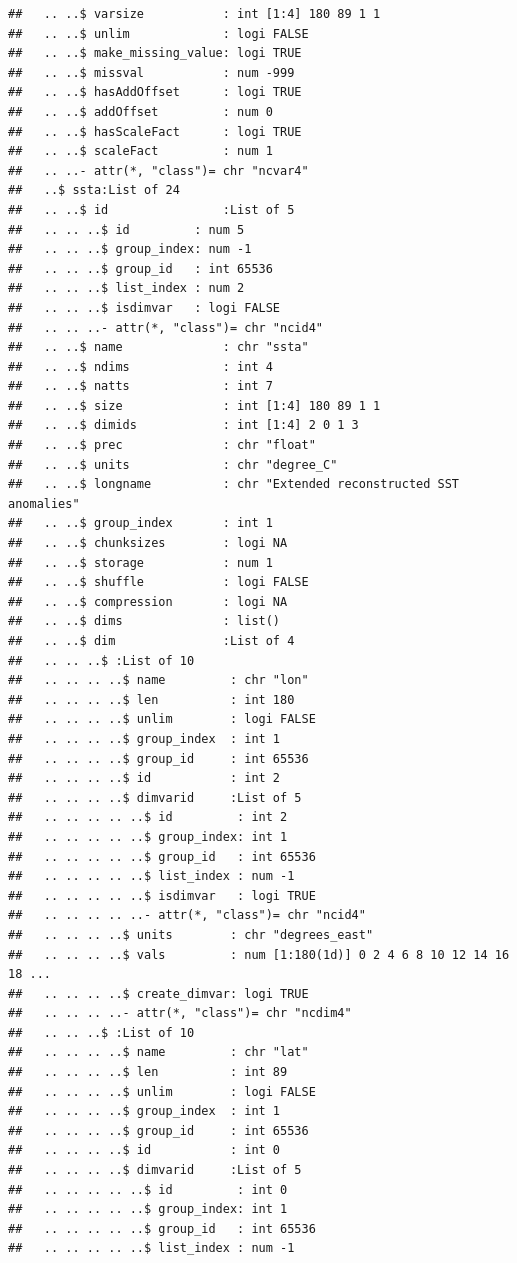 \documentclass{article}\usepackage[]{graphicx}\usepackage[]{color}
\makeatletter
\newenvironment{kframe}{%
 \def\at@end@of@kframe{}%
 \ifinner\ifhmode%
  \def\at@end@of@kframe{\end{minipage}}%
  \begin{minipage}{\columnwidth}%
 \fi\fi%
 \def\FrameCommand##1{\hskip\@totalleftmargin \hskip-\fboxsep
 \colorbox{shadecolor}{##1}\hskip-\fboxsep
     \hskip-\linewidth \hskip-\@totalleftmargin \hskip\columnwidth}%
 \MakeFramed {\advance\hsize-\width
   \@totalleftmargin\z@ \linewidth\hsize
   \@setminipage}}%
 {\par\unskip\endMakeFramed%
 \at@end@of@kframe}
\newenvironment{knitrout}{}{} %
\makeatother
\begin{document}
\begin{knitrout}
\begin{kframe}
\begin{verbatim}
##   .. ..$ varsize           : int [1:4] 180 89 1 1
##   .. ..$ unlim             : logi FALSE
##   .. ..$ make_missing_value: logi TRUE
##   .. ..$ missval           : num -999
##   .. ..$ hasAddOffset      : logi TRUE
##   .. ..$ addOffset         : num 0
##   .. ..$ hasScaleFact      : logi TRUE
##   .. ..$ scaleFact         : num 1
##   .. ..- attr(*, "class")= chr "ncvar4"
##   ..$ ssta:List of 24
##   .. ..$ id                :List of 5
##   .. .. ..$ id         : num 5
##   .. .. ..$ group_index: num -1
##   .. .. ..$ group_id   : int 65536
##   .. .. ..$ list_index : num 2
##   .. .. ..$ isdimvar   : logi FALSE
##   .. .. ..- attr(*, "class")= chr "ncid4"
##   .. ..$ name              : chr "ssta"
##   .. ..$ ndims             : int 4
##   .. ..$ natts             : int 7
##   .. ..$ size              : int [1:4] 180 89 1 1
##   .. ..$ dimids            : int [1:4] 2 0 1 3
##   .. ..$ prec              : chr "float"
##   .. ..$ units             : chr "degree_C"
##   .. ..$ longname          : chr "Extended reconstructed SST anomalies"
##   .. ..$ group_index       : int 1
##   .. ..$ chunksizes        : logi NA
##   .. ..$ storage           : num 1
##   .. ..$ shuffle           : logi FALSE
##   .. ..$ compression       : logi NA
##   .. ..$ dims              : list()
##   .. ..$ dim               :List of 4
##   .. .. ..$ :List of 10
##   .. .. .. ..$ name         : chr "lon"
##   .. .. .. ..$ len          : int 180
##   .. .. .. ..$ unlim        : logi FALSE
##   .. .. .. ..$ group_index  : int 1
##   .. .. .. ..$ group_id     : int 65536
##   .. .. .. ..$ id           : int 2
##   .. .. .. ..$ dimvarid     :List of 5
##   .. .. .. .. ..$ id         : int 2
##   .. .. .. .. ..$ group_index: int 1
##   .. .. .. .. ..$ group_id   : int 65536
##   .. .. .. .. ..$ list_index : num -1
##   .. .. .. .. ..$ isdimvar   : logi TRUE
##   .. .. .. .. ..- attr(*, "class")= chr "ncid4"
##   .. .. .. ..$ units        : chr "degrees_east"
##   .. .. .. ..$ vals         : num [1:180(1d)] 0 2 4 6 8 10 12 14 16 18 ...
##   .. .. .. ..$ create_dimvar: logi TRUE
##   .. .. .. ..- attr(*, "class")= chr "ncdim4"
##   .. .. ..$ :List of 10
##   .. .. .. ..$ name         : chr "lat"
##   .. .. .. ..$ len          : int 89
##   .. .. .. ..$ unlim        : logi FALSE
##   .. .. .. ..$ group_index  : int 1
##   .. .. .. ..$ group_id     : int 65536
##   .. .. .. ..$ id           : int 0
##   .. .. .. ..$ dimvarid     :List of 5
##   .. .. .. .. ..$ id         : int 0
##   .. .. .. .. ..$ group_index: int 1
##   .. .. .. .. ..$ group_id   : int 65536
##   .. .. .. .. ..$ list_index : num -1

\end{verbatim}
\end{kframe}
\end{knitrout}
\end{document}
